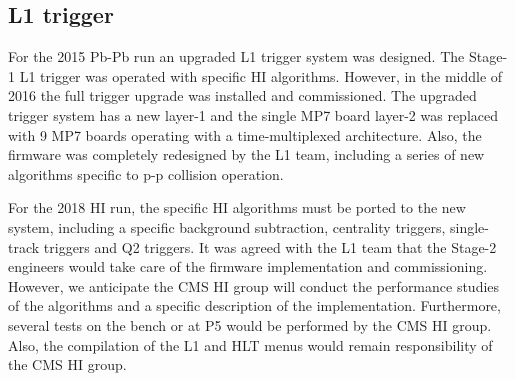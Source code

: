 \subsection{L1 trigger\label{subsec:L1Trigger}} 
For the 2015 Pb-Pb run an upgraded L1 trigger system was designed. The Stage-1 L1 trigger was operated with specific HI algorithms. 
However, in the middle of 2016 the full trigger upgrade was installed and commissioned. The upgraded trigger system has a new
layer-1 and the single MP7 board layer-2 was replaced with 9 MP7 boards operating with a time-multiplexed architecture.
Also, the firmware was completely redesigned by the L1 team, including a series of new algorithms specific to p-p
collision operation.

For the 2018 HI run, the specific HI algorithms must be ported to the new system, including a specific background
subtraction, centrality triggers, single-track triggers and Q2 triggers. It was agreed with the L1 team that the Stage-2
engineers would take care of the firmware implementation and commissioning. However, we anticipate the CMS HI group will
conduct the performance studies of the algorithms and a specific description of the implementation. Furthermore, several
tests on the bench or at P5 would be performed by the CMS HI group. Also, the compilation of the L1 and HLT menus would
remain responsibility of the CMS HI group.
